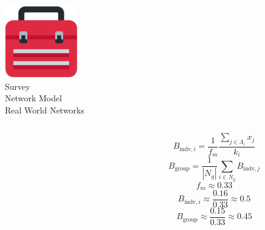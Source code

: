 \documentclass{beamer}
\begin{document}
\begin{frame}
    \begin{center}
        \includegraphics[width=.07\textwidth]{static/toolbox.png} \\ \vspace{.5cm}
        \large{Survey} \\ \vspace{.5cm}
        \large{Network Model} \\ \vspace{.5cm}
        \large{Real World Networks} \\ \vspace{.5cm}
    \end{center}
\end{frame}

\begin{frame}
    \begin{columns}
        \begin{column}{.5\textwidth}
            \begin{center}
                
            \end{center}
        \end{column}
        \begin{column}{.5\textwidth}
            \begin{center}
                $$B_{\text{indv}, i} = \frac{1}{f_m} \frac{\sum_{j \in \Lambda_i} x_j}{k_i}$$
                $$B_{\text{group}} = \frac{1}{|N_g|} \sum_{i \in N_g} B_{\text{indv}, j}$$
                \pause
                $$f_m \approx 0.33$$
                $$ B_{\text{indv}, i} \approx  \frac{0.16}{0.33} \approx 0.5 $$
                \pause
                $$B_{\text{group}} \approx  \frac{0.15}{0.33} \approx 0.45 $$
            \end{center}
        \end{column}
    \end{columns}
\end{frame}
\end{document}
